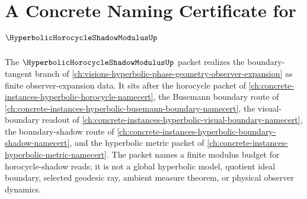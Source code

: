 \chapter{A Concrete Naming Certificate for $\HyperbolicHorocycleShadowModulusUp$}
\label{ch:concrete-instances-hyperbolic-horocycle-shadow-modulus-namecert}

The $\HyperbolicHorocycleShadowModulusUp$ packet realizes the boundary-tangent branch of \autoref{ch:visions-hyperbolic-phase-geometry-observer-expansion} as finite observer-expansion data. It sits after the horocycle packet of \autoref{ch:concrete-instances-hyperbolic-horocycle-namecert}, the Busemann boundary route of \autoref{ch:concrete-instances-hyperbolic-busemann-boundary-namecert}, the visual-boundary readout of \autoref{ch:concrete-instances-hyperbolic-visual-boundary-namecert}, the boundary-shadow route of \autoref{ch:concrete-instances-hyperbolic-boundary-shadow-namecert}, and the hyperbolic metric packet of \autoref{ch:concrete-instances-hyperbolic-metric-namecert}. The packet names a finite modulus budget for horocycle-shadow reads; it is not a global hyperbolic model, quotient ideal boundary, selected geodesic ray, ambient measure theorem, or physical observer dynamics.

